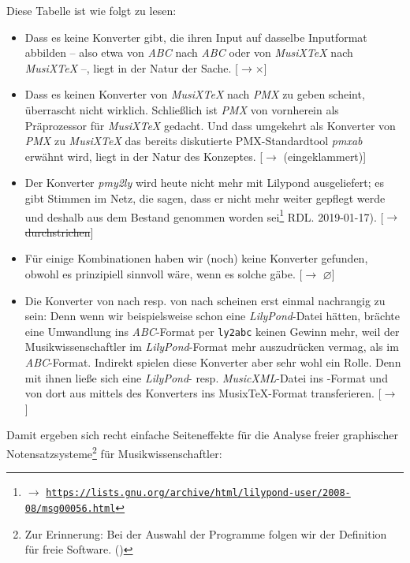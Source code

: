 Diese Tabelle ist wie folgt zu lesen:

\begin{itemize}
  \item Dass es keine Konverter gibt, die ihren Input auf dasselbe Inputformat
  abbilden -- also etwa von \textit{ABC} nach \textit{ABC} oder von
  \textit{MusiX\TeX} nach \textit{MusiX\TeX} --, liegt in der Natur der Sache.
  [$\rightarrow \times$] \item Dass es keinen Konverter von \textit{MusiX\TeX}
  nach \textit{PMX} zu geben scheint, überrascht nicht wirklich. Schließlich ist
  \textit{PMX} von vornherein als Präprozessor für \textit{MusiX\TeX} gedacht.
  Und dass umgekehrt als Konverter von \textit{PMX} zu \textit{MusiX\TeX} das
  bereits diskutierte PMX-Standardtool \textit{pmxab} erwähnt wird, liegt in der
  Natur des Konzeptes. [$\rightarrow$ (eingeklammert)]
  \item Der Konverter \textit{pmy2ly} wird heute nicht mehr mit Lilypond
  ausgeliefert; es gibt Stimmen im Netz, die sagen, dass er nicht mehr weiter
  gepflegt werde und deshalb aus dem Bestand genommen worden sei\footnote{$\rightarrow$
  \href{https://lists.gnu.org/archive/html/lilypond-user/2008-08/msg00056.html}{
  \texttt{https://lists.gnu.org/archive/html/lilypond-user/2008-08/msg00056.html}}}
  RDL. 2019-01-17). [$\rightarrow$ \sout{durchstrichen}]
  \item Für einige Kombinationen haben wir (noch) keine Konverter gefunden,
  obwohl es prinzipiell sinnvoll wäre, wenn es solche gäbe. [$\rightarrow$
  $\varnothing$] \item Die Konverter von  nach  resp. von
   nach  scheinen erst einmal nachrangig zu sein: Denn
  wenn wir beispielsweise schon eine \textit{LilyPond}-Datei hätten, brächte
  eine Umwandlung ins \textit{ABC}-Format per \texttt{ly2abc} keinen Gewinn
  mehr, weil der Musikwissenschaftler im \textit{LilyPond}-Format mehr
  auszudrücken vermag, als im \textit{ABC}-Format. Indirekt spielen diese
  Konverter aber sehr wohl ein Rolle. Denn mit ihnen ließe sich eine
  \textit{LilyPond}- resp. \textit{MusicXML}-Datei ins -Format und von
  dort aus mittels des Konverters  ins Musix\TeX-Format transferieren.
  [$\rightarrow$ ]
\end{itemize}

Damit ergeben sich recht einfache Seiteneffekte für die Analyse freier
graphischer Notensatzsysteme\footnote{Zur Erinnerung: Bei der Auswahl der
Programme folgen wir der Definition für freie Software. (\cite[Vgl.
dazu][\nopage wp]{FSF2018a})} für Musikwissenschaftler:

